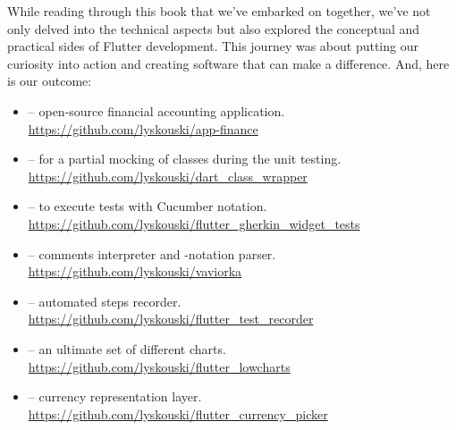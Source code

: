 
While reading through this book that we've embarked on together, we've not only delved into the technical aspects but 
also explored the conceptual and practical sides of Flutter development. This journey was about putting our curiosity 
into action and creating software that can make a difference. And, here is our outcome:

\begin{itemize}
\item {} -- open-source financial accounting application.\\
\href{https://github.com/lyskouski/app-finance}{https://github.com/lyskouski/app-finance}

\item {} -- for a partial mocking of classes during the unit testing.\\
\href{https://github.com/lyskouski/dart\_class\_wrapper}{https://github.com/lyskouski/dart\_class\_wrapper}

\item {} -- to execute tests with Cucumber notation.\\
\href{https://github.com/lyskouski/flutter\_gherkin\_widget\_tests}{https://github.com/lyskouski/flutter\_gherkin\_widget\_tests}

\item {} --  comments interpreter and -notation parser.\\
\href{https://github.com/lyskouski/vaviorka}{https://github.com/lyskouski/vaviorka}

\item {} -- automated steps recorder.\\
\href{https://github.com/lyskouski/flutter\_test\_recorder}{https://github.com/lyskouski/flutter\_test\_recorder}

\item {} -- an ultimate set of different charts.\\
\href{https://github.com/lyskouski/flutter\_lowcharts}{https://github.com/lyskouski/flutter\_lowcharts}

\item {} -- currency representation layer.\\
\href{https://github.com/lyskouski/flutter\_currency\_picker}{https://github.com/lyskouski/flutter\_currency\_picker}


\end{itemize}
